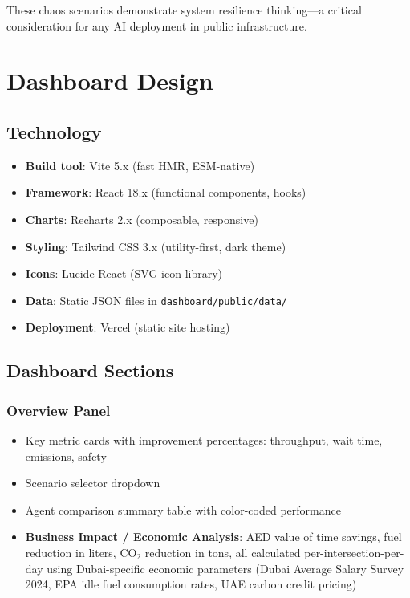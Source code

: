 \documentclass[12pt, a4paper]{article}
\begin{document}
These chaos scenarios demonstrate system resilience thinking---a critical consideration for any AI deployment in public infrastructure.

\section{Dashboard Design}

\subsection{Technology}

\begin{itemize}[nosep]
    \item \textbf{Build tool}: Vite 5.x (fast HMR, ESM-native)
    \item \textbf{Framework}: React 18.x (functional components, hooks)
    \item \textbf{Charts}: Recharts 2.x (composable, responsive)
    \item \textbf{Styling}: Tailwind CSS 3.x (utility-first, dark theme)
    \item \textbf{Icons}: Lucide React (SVG icon library)
    \item \textbf{Data}: Static JSON files in \texttt{dashboard/public/data/}
    \item \textbf{Deployment}: Vercel (static site hosting)
\end{itemize}

\subsection{Dashboard Sections}

\subsubsection{Overview Panel}
\begin{itemize}[nosep]
    \item Key metric cards with improvement percentages: throughput, wait time, emissions, safety
    \item Scenario selector dropdown
    \item Agent comparison summary table with color-coded performance
    \item \textbf{Business Impact / Economic Analysis}: AED value of time savings, fuel reduction in liters, CO$_2$ reduction in tons, all calculated per-intersection-per-day using Dubai-specific economic parameters (Dubai Average Salary Survey 2024, EPA idle fuel consumption rates, UAE carbon credit pricing)
\end{itemize}
\end{document}

